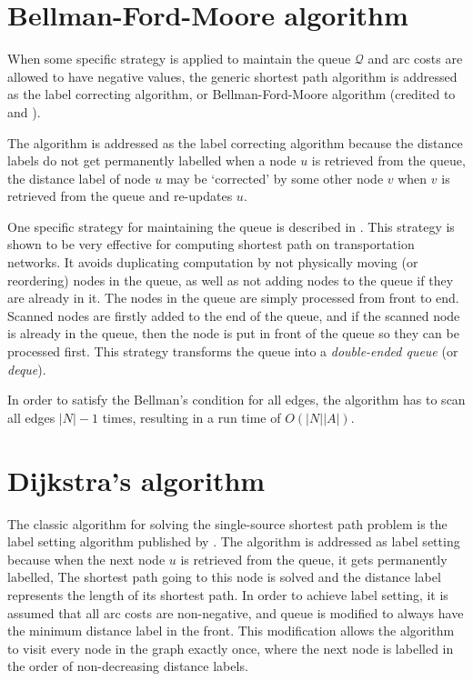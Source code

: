 \section{Bellman-Ford-Moore algorithm} \label{section:labelcorrectingalgorithm}
When some specific strategy is applied to maintain the queue $\mathcal{Q}$
and arc costs are allowed to have negative values,
the generic shortest path algorithm is addressed as the label correcting algorithm,
or Bellman-Ford-Moore algorithm (credited to \citet{Bellman, Ford} and \citet{Moore}).

The algorithm is addressed as the label correcting algorithm
because the distance labels do not get permanently labelled when a node $u$ is retrieved from the queue,
the distance label of node $u$ may be `corrected' by some other node $v$ when $v$ is retrieved from the queue and re-updates $u$.

One specific strategy for maintaining the queue is described in \citet{Sheffi}.
This strategy is shown to be very effective for computing shortest path on transportation networks.
It avoids duplicating computation by not physically moving (or reordering) nodes in the queue,
as well as not adding nodes to the queue if they are already in it.
The nodes in the queue are simply processed from front to end.
Scanned nodes are firstly added to the end of the queue,
and if the scanned node is already in the queue,
then the node is put in front of the queue so they can be processed first.
This strategy transforms the queue into a \emph{double-ended queue} (or \emph{deque}).

In order to satisfy the Bellman's condition for all edges,
the algorithm has to scan all edges $|N|-1$ times,
resulting in a run time of $O(|N||A|)$.

\section{Dijkstra's algorithm} \label{sec:dijkstra}
The classic algorithm for solving the single-source shortest path problem is the label setting algorithm published by \citet{Dijkstra}.
The algorithm is addressed as label setting because when the next node $u$ is retrieved from the queue,
it gets permanently labelled,
The shortest path going to this node is solved and 
the distance label represents the length of its shortest path.
In order to achieve label setting, 
it is assumed that all arc costs are non-negative,
and queue is modified to always have the minimum distance label in the front.
This modification allows the algorithm to visit every node in the graph exactly once,
where the next node is labelled in the order of non-decreasing distance labels.

